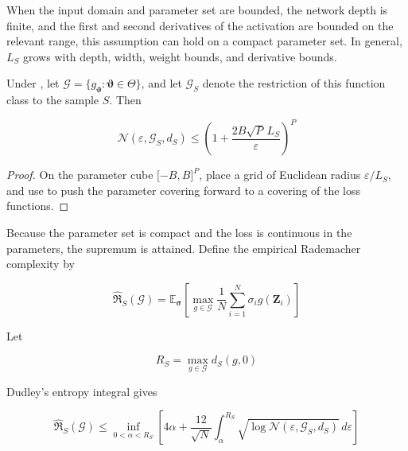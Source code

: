 When the input domain and parameter set are bounded, the network depth is finite, and the first and second derivatives of the activation are bounded on the relevant range, this assumption can hold on a compact parameter set. In general, \(L_{S}\) grows with depth, width, weight bounds, and derivative bounds.

\begin{lemma}\label{lem:finite-parameter-cover}
Under , let \(\mathcal{G}=\{g_{\bm{\vartheta}}:\bm{\vartheta}\in\Theta\}\), and let \(\mathcal{G}_{S}\) denote the restriction of this function class to the sample \(S\). Then

\begin{equation}
\label{eq:chnn-4-42}
\mathcal{N}\left( \varepsilon,\mathcal{G}_{S},d_{S} \right) \leq \left( 1 + \frac{2B\sqrt{P}\, L_{S}}{\varepsilon} \right)^{P}
\end{equation}
\end{lemma}

\begin{proof} On the parameter cube \(\lbrack - B,B\rbrack^{P}\), place a grid of Euclidean radius \(\varepsilon/L_{S}\), and use  to push the parameter covering forward to a covering of the loss functions.\end{proof}

Because the parameter set is compact and the loss is continuous in the parameters, the supremum is attained. Define the empirical Rademacher complexity by

\begin{equation}
\label{eq:chnn-4-43}
{\widehat{\mathfrak{R}}}_{S}\left( \mathcal{G} \right) = \mathbb{E}_{\bm{\sigma}}\left\lbrack \max_{g \in \mathcal{G}}\frac{1}{N}\sum_{i = 1}^{N}\sigma_{i}g\left( \mathbf{Z}_{i} \right) \right\rbrack
\end{equation}

Let

\begin{equation}
\label{eq:chnn-4-44}
R_{S} = \max_{g \in \mathcal{G}}d_{S}(g,0)
\end{equation}

Dudley's entropy integral gives\cite{Dudley1999UCLT}

\begin{equation}
\label{eq:chnn-4-45}
{\widehat{\mathfrak{R}}}_{S}\left( \mathcal{G} \right) \leq \inf_{0 < \alpha < R_{S}}\left\lbrack 4\alpha + \frac{12}{\sqrt{N}}\int_{\alpha}^{R_{S}}\sqrt{\log\mathcal{N}\left( \varepsilon,\mathcal{G}_{S},d_{S} \right)}\, d\varepsilon \right\rbrack
\end{equation}

